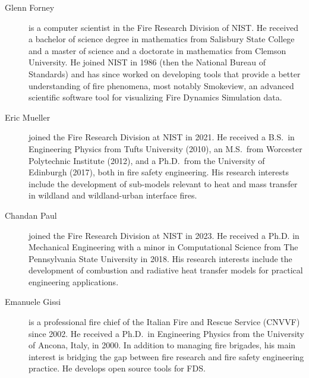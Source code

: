 \begin{description}
\item[Glenn Forney] is a computer scientist in the Fire Research Division of NIST.  He received a bachelor of science degree in mathematics from Salisbury State College and a master of science and a doctorate in mathematics from Clemson University.  He joined NIST in 1986 (then the National Bureau of Standards) and has since worked on developing tools that provide a better understanding of fire phenomena, most notably Smokeview, an advanced scientific software tool for visualizing Fire Dynamics Simulation data.

\item[Eric Mueller] joined the Fire Research Division at NIST in 2021. He received a B.S.~in Engineering Physics from Tufts University (2010), an M.S.~from Worcester Polytechnic Institute (2012), and a Ph.D.~from the University of Edinburgh (2017), both in fire safety engineering. His research interests include the development of sub-models relevant to heat and mass transfer in wildland and wildland-urban interface fires.

\item[Chandan Paul] joined the Fire Research Division at NIST in 2023. He received a Ph.D. in Mechanical Engineering with a minor in Computational Science from The Pennsylvania State University in 2018. His research interests include the development of combustion and radiative heat transfer models for practical engineering applications.



\item[Emanuele Gissi] is a professional fire chief of the Italian Fire and Rescue Service (CNVVF) since 2002. He received a Ph.D.~in Engineering Physics from the University of Ancona, Italy, in 2000. In addition to managing fire brigades, his main interest is bridging the gap between fire research and fire safety engineering practice. He develops open source tools for FDS.


\end{description}
